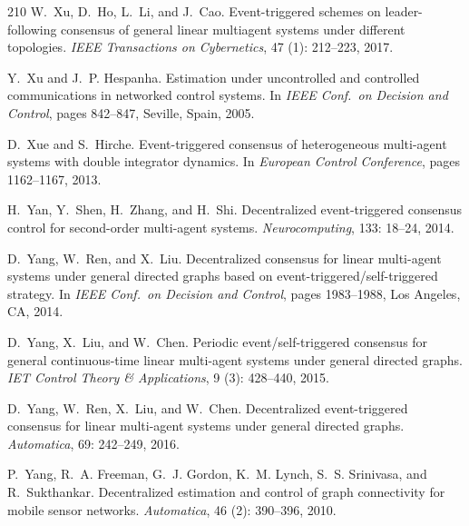\documentclass{autart}
\begin{document}
{\begin{thebibliography}{210}
W.~Xu, D.~Ho, L.~Li, and J.~Cao.
\newblock Event-triggered schemes on leader-following consensus of general
  linear multiagent systems under different topologies.
\newblock \emph{IEEE Transactions on Cybernetics}, 47 (1):
  212--223, 2017.

Y.~Xu and J.~P. Hespanha.
\newblock Estimation under uncontrolled and controlled communications in
  networked control systems.
\newblock In \emph{{IEEE} Conf.\ on Decision and Control}, pages 842--847,
  Seville, Spain, 2005.

D.~Xue and S.~Hirche.
\newblock Event-triggered consensus of heterogeneous multi-agent systems with
  double integrator dynamics.
\newblock In \emph{European Control Conference}, pages 1162--1167, 2013.

H.~Yan, Y.~Shen, H.~Zhang, and H.~Shi.
\newblock Decentralized event-triggered consensus control for second-order
  multi-agent systems.
\newblock \emph{Neurocomputing}, 133: 18--24, 2014.

D.~Yang, W.~Ren, and X.~Liu.
\newblock Decentralized consensus for linear multi-agent systems under general
  directed graphs based on event-triggered/self-triggered strategy.
\newblock In \emph{{IEEE} Conf.\ on Decision and Control}, pages 1983--1988,
  Los Angeles, CA, 2014.

D.~Yang, X.~Liu, and W.~Chen.
\newblock Periodic event/self-triggered consensus for general continuous-time
  linear multi-agent systems under general directed graphs.
\newblock \emph{IET Control Theory \& Applications}, 9 (3):
  428--440, 2015.

D.~Yang, W.~Ren, X.~Liu, and W.~Chen.
\newblock Decentralized event-triggered consensus for linear multi-agent
  systems under general directed graphs.
\newblock \emph{Automatica}, 69: 242--249, 2016.

P.~Yang, R.~A. Freeman, G.~J. Gordon, K.~M. Lynch, S.~S. Srinivasa, and
  R.~Sukthankar.
\newblock Decentralized estimation and control of graph connectivity for mobile
  sensor networks.
\newblock \emph{Automatica}, 46 (2): 390--396, 2010.


\end{thebibliography}}
\end{document}
